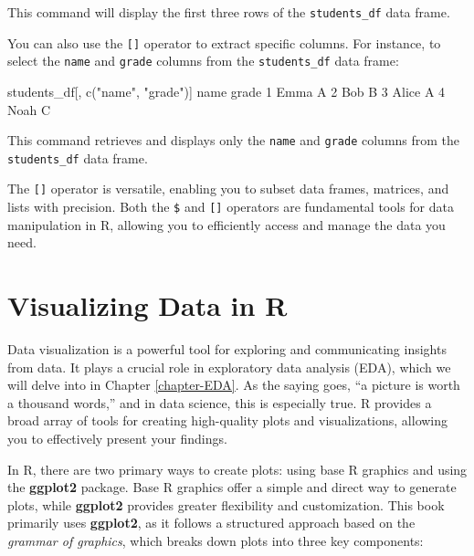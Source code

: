 \documentclass[
  11pt,
]{book}
\makeatletter
\newenvironment{Shaded}{}{}
\newcommand{\DecValTok}[1]{#1}
\newcommand{\FunctionTok}[1]{#1}
\newcommand{\NormalTok}[1]{#1}
\newcommand{\StringTok}[1]{\textcolor[rgb]{0.39,0.39,0.39}{#1}}
\newenvironment{kframe}{%
\medskip{}
\setlength{\fboxsep}{.8em}
 \def\at@end@of@kframe{}%
 \ifinner\ifhmode%
  \def\at@end@of@kframe{\end{minipage}}%
  \begin{minipage}{\columnwidth}%
 \fi\fi%
 \def\FrameCommand##1{\hskip\@totalleftmargin \hskip-\fboxsep
 \colorbox{shadecolor}{##1}\hskip-\fboxsep
     \hskip-\linewidth \hskip-\@totalleftmargin \hskip\columnwidth}%
 \MakeFramed {\advance\hsize-\width
   \@totalleftmargin\z@ \linewidth\hsize
   \@setminipage}}%
 {\par\unskip\endMakeFramed%
 \at@end@of@kframe}
\renewenvironment{Shaded}{\begin{kframe}}{\end{kframe}}
\theoremstyle{definition}
\theoremstyle{definition}
\theoremstyle{definition}
\theoremstyle{definition}
\theoremstyle{remark}
\makeatother
\begin{document}
This command will display the first three rows of the \texttt{students\_df} data frame.

You can also use the \texttt{{[}{]}} operator to extract specific columns. For instance, to select the \texttt{name} and \texttt{grade} columns from the \texttt{students\_df} data frame:

\begin{Shaded}
\begin{Highlighting}[]
\NormalTok{students\_df[, }\FunctionTok{c}\NormalTok{(}\StringTok{"name"}\NormalTok{, }\StringTok{"grade"}\NormalTok{)]}
\NormalTok{      name grade}
   \DecValTok{1}\NormalTok{  Emma     A}
   \DecValTok{2}\NormalTok{   Bob     B}
   \DecValTok{3}\NormalTok{ Alice     A}
   \DecValTok{4}\NormalTok{  Noah     C}
\end{Highlighting}
\end{Shaded}

This command retrieves and displays only the \texttt{name} and \texttt{grade} columns from the \texttt{students\_df} data frame.

The \texttt{{[}{]}} operator is versatile, enabling you to subset data frames, matrices, and lists with precision. Both the \texttt{\$} and \texttt{{[}{]}} operators are fundamental tools for data manipulation in R, allowing you to efficiently access and manage the data you need.

\section{Visualizing Data in R}\label{visualizing-data-in-r}

Data visualization is a powerful tool for exploring and communicating insights from data. It plays a crucial role in exploratory data analysis (EDA), which we will delve into in Chapter \ref{chapter-EDA}. As the saying goes, ``a picture is worth a thousand words,'' and in data science, this is especially true. R provides a broad array of tools for creating high-quality plots and visualizations, allowing you to effectively present your findings.

In R, there are two primary ways to create plots: using base R graphics and using the \textbf{ggplot2} package. Base R graphics offer a simple and direct way to generate plots, while \textbf{ggplot2} provides greater flexibility and customization. This book primarily uses \textbf{ggplot2}, as it follows a structured approach based on the \emph{grammar of graphics}, which breaks down plots into three key components:
\end{document}
